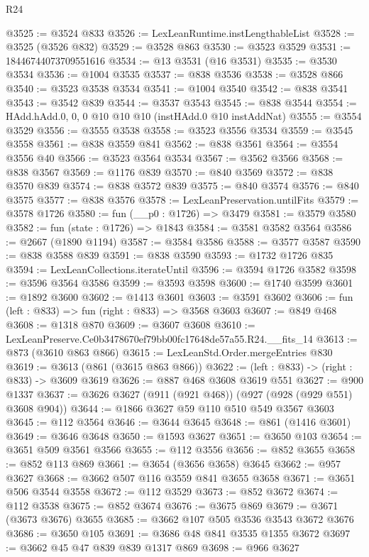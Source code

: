 \begin{lexlean}{R24}
\begin{coremodule}
@3525 := @3524 @833
@3526 := LexLeanRuntime.instLengthableList
@3528 := @3525 (@3526 @832)
@3529 := @3528 @863
@3530 := @3523 @3529
@3531 := 18446744073709551616
@3534 := @13 @3531 (@16 @3531)
@3535 := @3530 @3534
@3536 := @1004 @3535
@3537 := @838 @3536
@3538 := @3528 @866
@3540 := @3523 @3538 @3534
@3541 := @1004 @3540
@3542 := @838 @3541
@3543 := @3542 @839
@3544 := @3537 @3543
@3545 := @838 @3544
@3554 := HAdd.hAdd.{0, 0, 0} @10 @10 @10 (instHAdd.{0} @10 instAddNat)
@3555 := @3554 @3529
@3556 := @3555 @3538
@3558 := @3523 @3556 @3534
@3559 := @3545 @3558
@3561 := @838 @3559 @841
@3562 := @838 @3561
@3564 := @3554 @3556 @40
@3566 := @3523 @3564 @3534
@3567 := @3562 @3566
@3568 := @838 @3567
@3569 := @1176 @839
@3570 := @840 @3569
@3572 := @838 @3570 @839
@3574 := @838 @3572 @839
@3575 := @840 @3574
@3576 := @840 @3575
@3577 := @838 @3576
@3578 := LexLeanPreservation.untilFits
@3579 := @3578 @1726
@3580 := fun (__p0 : @1726) => @3479
@3581 := @3579 @3580
@3582 := fun (state : @1726) => @1843
@3584 := @3581 @3582 @3564
@3586 := @2667 (@1890 @1194)
@3587 := @3584 @3586
@3588 := @3577 @3587
@3590 := @838 @3588 @839
@3591 := @838 @3590
@3593 := @1732 @1726 @835
@3594 := LexLeanCollections.iterateUntil
@3596 := @3594 @1726 @3582
@3598 := @3596 @3564 @3586
@3599 := @3593 @3598
@3600 := @1740 @3599
@3601 := @1892 @3600
@3602 := @1413 @3601
@3603 := @3591 @3602
@3606 := fun (left : @833) => fun (right : @833) => @3568 @3603
@3607 := @849 @468
@3608 := @1318 @870
@3609 := @3607 @3608
@3610 := LexLeanPreserve.Ce0b3478670ef79bb00fc17648de57a55.R24.__fits_14
@3613 := @873 (@3610 @863 @866)
@3615 := LexLeanStd.Order.mergeEntries @830
@3619 := @3613 (@861 (@3615 @863 @866))
@3622 := (left : @833) -> (right : @833) -> @3609 @3619
@3626 := @887 @468 @3608 @3619 @551
@3627 := @900 @1337
@3637 := @3626 @3627 (@911 (@921 @468)) (@927 (@928 (@929 @551) @3608 @904))
@3644 := @1866 @3627 @59 @110 @510 @549 @3567 @3603
@3645 := @112 @3564
@3646 := @3644 @3645
@3648 := @861 (@1416 @3601)
@3649 := @3646 @3648
@3650 := @1593 @3627
@3651 := @3650 @103
@3654 := @3651 @509 @3561 @3566
@3655 := @112 @3556
@3656 := @852 @3655
@3658 := @852 @113 @869
@3661 := @3654 (@3656 @3658) @3645
@3662 := @957 @3627
@3668 := @3662 @507 @116 @3559 @841 @3655 @3658
@3671 := @3651 @506 @3544 @3558
@3672 := @112 @3529
@3673 := @852 @3672
@3674 := @112 @3538
@3675 := @852 @3674
@3676 := @3675 @869
@3679 := @3671 (@3673 @3676) @3655
@3685 := @3662 @107 @505 @3536 @3543 @3672 @3676
@3686 := @3650 @105
@3691 := @3686 @48 @841 @3535 @1355 @3672
@3697 := @3662 @45 @47 @839 @839 @1317 @869
@3698 := @966 @3627

\end{coremodule}
\end{lexlean}
